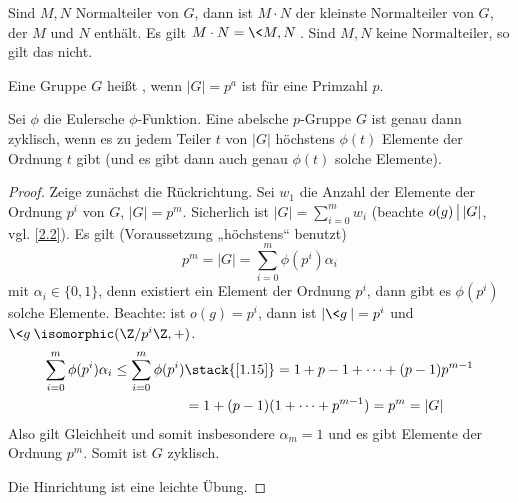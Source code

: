 \begin{nt*}
	Sind $M, N$ Normalteiler von $G$, dann ist $M \cdot N$ der kleinste Normalteiler von $G$, der $M$ und $N$ enthält.
	Es gilt $M \cdot N = \<M, N\>$.
	Sind $M, N$ keine Normalteiler, so gilt das nicht.
\end{nt*}

\begin{df}
	Eine Gruppe $G$ heißt , wenn $|G| = p^a$ ist für eine Primzahl $p$.
\end{df}

\begin{lem} \label{2.6}
	Sei $\phi$ die Eulersche $\phi$-Funktion.
	Eine abelsche $p$-Gruppe $G$ ist genau dann zyklisch, wenn es zu jedem Teiler $t$ von $|G|$ höchstens $\phi(t)$ Elemente der Ordnung $t$ gibt (und es gibt dann auch genau $\phi(t)$ solche Elemente).
	\begin{proof}
		Zeige zunächst die Rückrichtung.
		Sei $w_1$ die Anzahl der Elemente der Ordnung $p^i$ von $G$, $|G| = p^m$.
		Sicherlich ist $|G| = \sum_{i=0}^m w_i$ (beachte $o(g) \divs |G|$, vgl. \ref{2.2}).
		Es gilt (Voraussetzung „höchstens“ benutzt)
		\[
			p^m = |G|
			= \sum_{i=0}^m \phi(p^i) \alpha_i
		\]
		mit $\alpha_i \in \{0, 1\}$, denn existiert ein Element der Ordnung $p^i$, dann gibt es $\phi(p^i)$ solche Elemente.
		Beachte: ist $o(g) = p^i$, dann ist $|\<g\>| = p^i$ und $\<g\> \isomorphic (\Z / p^i \Z, +)$.
		\begin{align*}
			\sum_{i=0}^m \phi(p^i) \alpha_i
			\le \sum_{i=0}^m \phi(p^i)
			&\stack{\ref{1.15}}= 1 + p-1 + \dotsb + (p-1) p^{m-1} \\
			&= 1 + (p-1) (1 + \dotsb + p^{m-1})
			= p^m
			= |G|
		\end{align*}
		Also gilt Gleichheit und somit insbesondere $\alpha_m = 1$ und es gibt Elemente der Ordnung $p^m$.
		Somit ist $G$ zyklisch.

		Die Hinrichtung ist eine leichte Übung.
	\end{proof}
\end{lem}

